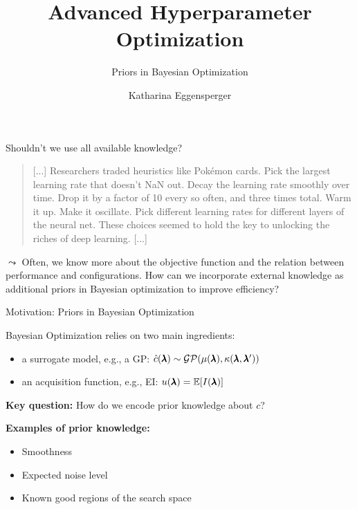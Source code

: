 \documentclass[main]{subfiles}
\title[Advanced Hyperparameter Optimization]{Advanced Hyperparameter Optimization}
\subtitle{Priors in Bayesian Optimization}
\author[Katharina Eggensperger]{Katharina Eggensperger}
\date{}
\begin{document}
	
	\maketitle
	

\begin{frame}[c]{Shouldn't we use all available knowledge?}

\begin{quote}
    [...] Researchers traded heuristics like Pokémon cards. Pick the largest learning rate that doesn’t NaN out. Decay the learning rate smoothly over time. Drop it by a factor of 10 every so often, and three times total. Warm it up. Make it oscillate. Pick different learning rates for different layers of the neural net. These choices seemed to hold the key to unlocking the riches of deep learning. [...] \\
\end{quote}

\vspace{0.5cm}
$\leadsto$ Often, we know more about the objective function and the relation between performance and configurations. How can we incorporate external knowledge as additional priors in Bayesian optimization to improve efficiency?

\end{frame}
\begin{frame}{Motivation: Priors in Bayesian Optimization}

Bayesian Optimization relies on two main ingredients:
\begin{itemize}
    \item a surrogate model, e.g., a GP: $\hat{c}(\pmb{\lambda}) \sim \mathcal{GP}(\mu(\pmb{\lambda}), \kappa(\pmb{\lambda},\pmb{\lambda}'))$
    \item an acquisition function, e.g., EI: $u(\pmb{\lambda}) = \mathbb{E} [ I(\pmb{\lambda})]$
\end{itemize}

\vspace{0.3cm}

\textbf{Key question:} How do we encode prior knowledge about $c$?

\vspace{0.3cm}

\textbf{Examples of prior knowledge:}
\begin{itemize}
    \item Smoothness
    \item Expected noise level
    \item Known good regions of the search space
\end{itemize}

\end{frame}
\end{document}

